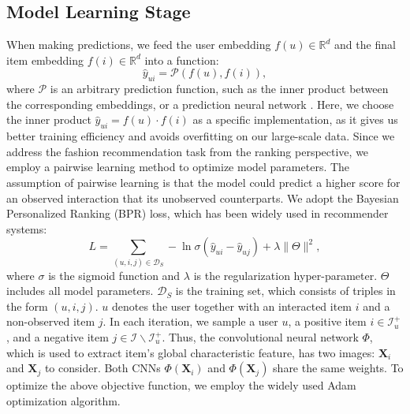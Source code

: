 \documentclass{article}
\begin{document}
\subsection{Model Learning Stage}
When making predictions, we feed the user embedding $f(u)\in \mathbb{R}^d$ and the final item embedding $f(i)\in \mathbb{R}^d$ into a function:
\begin{equation}
    \hat { y } _ { u i } = \mathcal { P } \left( f(u) , f(i) \right),
\end{equation}
where $\mathcal{P}$ is an arbitrary prediction function, such as the inner product between the corresponding embeddings, or a prediction neural network \cite{he2017neural}. Here, we choose the inner product $\hat { y } _ { u i } =  f(u) \cdot f(i)$ as a specific implementation, as it gives us better training efficiency and avoids overfitting on our large-scale data.
Since we address the fashion recommendation task from the ranking perspective, we employ a pairwise learning method to optimize model parameters. The assumption of pairwise learning is that the model could predict a higher score for an observed interaction that its unobserved counterparts. We adopt the Bayesian Personalized Ranking (BPR) \cite{rendle2009bpr} loss, which has been widely used in recommender systems:
\begin{equation}
     L  = \sum _ { ( u , i , j ) \in \mathcal { D } _ { S } } - \ln \sigma \left( \hat { y } _ { u i } - \hat { y } _ { u j } \right) + \lambda \| \Theta \| ^ { 2 },
\end{equation}
where $\sigma$ is the sigmoid function and $\lambda$ is the regularization hyper-parameter. $\Theta$ includes all model parameters. $\mathcal { D } _ { S } $ is the training set, which consists of triples in the form $(u, i, j)$. $u$ denotes the user together with an interacted item $i$ and a non-observed item $j$. In each iteration, we sample a user $u$, a positive item $i \in \mathcal { I } _ { u } ^ { + }$, and a negative item $j \in \mathcal { I } \backslash \mathcal { I } _ { u } ^ { + }$. Thus, the convolutional neural network $\Phi$, which is used to extract item's global characteristic feature, has two images: $\mathbf { X } _ { i }$ and $\mathbf { X } _ { j }$ to consider. Both CNNs $\Phi \left( \mathbf { X } _ { i } \right)$ and $\Phi \left( \mathbf { X } _ { j } \right)$ share the same weights. To optimize the above objective function, we employ the widely used Adam \cite{kingma2014adam} optimization algorithm. 
\end{document}
